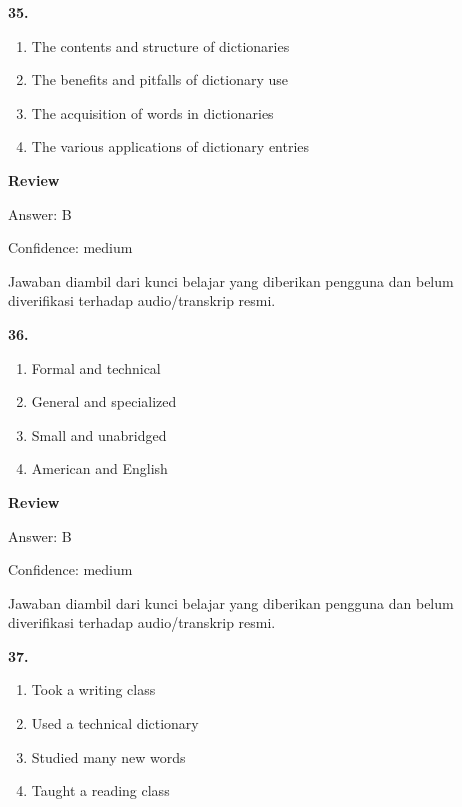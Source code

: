 \documentclass[12pt]{article}
\begin{document}
\noindent\textbf{35.}
\begin{enumerate}[label=(\Alph*),leftmargin=*,itemsep=0.2em]
\item The contents and structure of dictionaries
\item The benefits and pitfalls of dictionary use
\item The acquisition of words in dictionaries
\item The various applications of dictionary entries
\end{enumerate}
\par
\begingroup
\setlength{\parskip}{0pt}
\setlength{\parindent}{0pt}
\textbf{Review}\par
Answer: B\par
Confidence: medium\par
Jawaban diambil dari kunci belajar yang diberikan pengguna dan belum diverifikasi terhadap audio/transkrip resmi.\par
\endgroup
\par
\vspace{0.25\baselineskip}
\noindent\textbf{36.}
\begin{enumerate}[label=(\Alph*),leftmargin=*,itemsep=0.2em]
\item Formal and technical
\item General and specialized
\item Small and unabridged
\item American and English
\end{enumerate}
\par
\begingroup
\setlength{\parskip}{0pt}
\setlength{\parindent}{0pt}
\textbf{Review}\par
Answer: B\par
Confidence: medium\par
Jawaban diambil dari kunci belajar yang diberikan pengguna dan belum diverifikasi terhadap audio/transkrip resmi.\par
\endgroup
\par
\vspace{0.25\baselineskip}
\noindent\textbf{37.}
\begin{enumerate}[label=(\Alph*),leftmargin=*,itemsep=0.2em]
\item Took a writing class
\item Used a technical dictionary
\item Studied many new words
\item Taught a reading class
\end{enumerate}
\par
\end{document}
